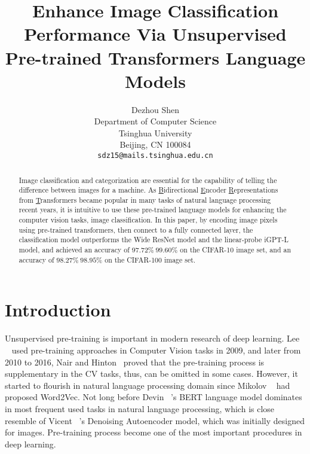 \documentclass[review]{cvpr}
\begin{document}
\title{Enhance Image Classification Performance Via Unsupervised Pre-trained Transformers Language Models}

\author{Dezhou Shen\\
Department of Computer Science\\
Tsinghua University\\
Beijing, CN 100084\\
{\tt\small sdz15@mails.tsinghua.edu.cn}
}

\maketitle


\begin{abstract}

  Image classification and categorization are essential for the capability of telling the difference between images for a machine.
  As \underline{B}idirectional \underline{E}ncoder \underline{R}epresentations from \underline{T}ransformers became popular in many tasks of natural language processing recent years,
  it is intuitive to use these pre-trained language models for enhancing the computer vision tasks, \eg image classification.
  In this paper, by encoding image pixels using pre-trained transformers, then connect to a fully connected layer,
  the classification model outperforms the Wide ResNet model and the linear-probe iGPT-L model,
  and achieved an accuracy of $97.72\%~99.60\%$ on the CIFAR-10 image set, and an accuracy of $98.27\%~98.95\%$ on the CIFAR-100 image set.

\end{abstract}

\section{Introduction}

  Unsupervised pre-training is important in modern research of deep learning.
  Lee \etal~\cite{lee2009convolutional} used pre-training approaches
  in Computer Vision tasks in 2009, and later from 2010 to 2016, Nair and Hinton~\cite{nair2010rectified} proved that the pre-training process is supplementary in the CV tasks,
  thus, can be omitted in some cases.
  However, it started to flourish in natural language processing domain since Mikolov \etal~\cite{mikolov2013distributed} had proposed Word2Vec.
  Not long before Devin \etal~\cite{devlin2018bert}'s BERT language model dominates in most frequent used tasks in natural language processing,
  which is close resemble of Vicent \etal~\cite{vincent2008extracting}'s Denoising Autoencoder model, which was initially designed for images.
  Pre-training process become one of the most important procedures in deep learning.
\end{document}
